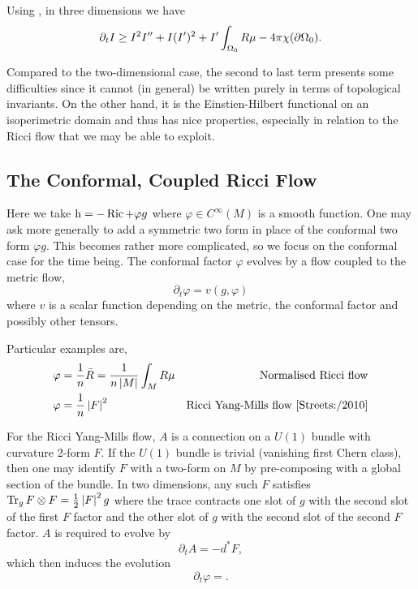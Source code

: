 \documentclass{amsart}
\begin{document}
Using , in three dimensions we have
\begin{equation}
\label{eq:3d_viscosity_ricciflow}
\partial_t I \geq I^2I'' + I(I')^2 + I'\int_{\Omega_0} R \mu - 4\pi\chi(\partial {\Omega_0}).
\end{equation}

Compared to the two-dimensional case, the second to last term presents some difficulties since it cannot (in general) be written purely in terms of topological invariants. On the other hand, it is the Einstien-Hilbert functional on an isoperimetric domain and thus has nice properties, especially in relation to the Ricci flow that we may be able to exploit.

\subsection{The Conformal, Coupled Ricci Flow }
\label{subsec:flows_ricci_coupled}

Here we take \(\operatorname{h} = -\operatorname{Ric} + \varphi g\) where \(\varphi \in C^{\infty}(M)\) is a smooth function. One may ask more generally to add a symmetric two form in place of the conformal two form \(\varphi g\). This becomes rather more complicated, so we focus on the conformal case for the time being. The conformal factor \(\varphi\) evolves by a flow coupled to the metric flow,
\[
\partial_t \varphi = v(g, \varphi)
\]
where \(v\) is a scalar function depending on the metric, the conformal factor and possibly other tensors.

Particular examples are,
\begin{align*}
\varphi &= \frac{1}{n} \bar{R} = \frac{1}{n\left|{M}\right|} \int_M R \mu & \text{Normalised Ricci flow} \\
\varphi &= \frac{1}{n} \left|{F}\right|^2 & \text{Ricci Yang-Mills flow \cite{Streets:/2010}}
\end{align*}

For the Ricci Yang-Mills flow, \(A\) is a connection on a \(U(1)\) bundle with curvature 2-form \(F\). If the \(U(1)\) bundle is trivial (vanishing first Chern class), then one may identify \(F\) with a two-form on \(M\) by pre-composing with a global section of the bundle. In two dimensions, any such \(F\) satisfies \(\operatorname{Tr}_g F \otimes F = \tfrac{1}{2} \left|{F}\right|^2 g\) where the trace contracts one slot of \(g\) with the second slot of the first \(F\) factor and the other slot of \(g\) with the second slot of the second \(F\) factor. \(A\) is required to evolve by
\[
\partial_t A = -d^{\ast} F,
\]
which then induces the evolution
\[
\partial_t \varphi = .
\]
\end{document}
